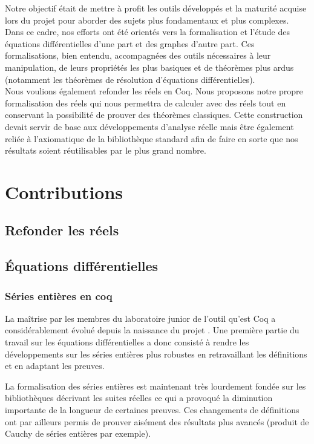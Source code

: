 \documentclass[11pt]{article}
\begin{document}
Notre objectif était de mettre à profit les outils développés et la maturité acquise lors du projet \coquille{} pour aborder des sujets plus fondamentaux et plus complexes. Dans ce cadre, nos efforts ont été orientés vers la formalisation et l'étude des équations différentielles d'une part et des graphes d'autre part. Ces formalisations, bien entendu, accompagnées des outils nécessaires à leur manipulation, de leurs propriétés les plus basiques et de théorèmes plus ardus (notamment les théorèmes de résolution d'équations différentielles).\\

Nous voulions également refonder les réels en Coq. Nous proposons notre propre formalisation des réels qui nous permettra de calculer avec des réels tout en conservant la possibilité de prouver des théorèmes classiques. Cette construction devait servir de base aux développements d'analyse réelle mais être également reliée à l'axiomatique de la bibliothèque standard afin de faire en sorte que nos résultats soient réutilisables par le plus grand nombre.

\section{Contributions}

\subsection{Refonder les réels}

\subsection{Équations différentielles}

\subsubsection{Séries entières en coq}

La maîtrise par les membres du laboratoire junior de l'outil qu'est Coq a
considérablement évolué depuis la naissance du projet \coquille{}. Une première
partie du travail sur les équations différentielles a donc consisté à rendre les
développements sur les séries entières plus robustes en retravaillant les définitions
et en adaptant les preuves.

La formalisation des séries entières est maintenant très lourdement fondée sur les
bibliothèques décrivant les suites réelles ce qui a provoqué la diminution importante
de la longueur de certaines preuves. Ces changements de définitions ont par ailleurs
permis de prouver aisément des résultats plus avancés (produit de Cauchy de séries
entières par exemple).
\end{document}
